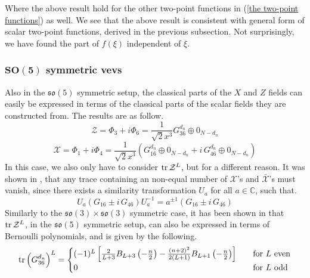 %
%
Where the above result hold for the other two-point functions in (\ref{the two-point functions}) as well. We see that the above result is consistent with general form of scalar two-point functions, derived in the previous subsection. Not surprisingly, we have found the part of $f(\xi)$ independent of $\xi$. 

\subsubsection[$SO(5)$ symmetric vevs]{$\mathbf{SO(5)}$ symmetric vevs}
Also in the $\mathfrak{so}(5)$ symmetric setup, the classical parts of the $X$ and $Z$ fields can easily be expressed in terms of the classical parts of the scalar fields they are constructed from. The results are as follow.
%
%
\begin{equation}
\mathcal{Z} = \Phi_3 + i \Phi_6
= \frac{1}{\sqrt{2} x^3}
G_{36}^{d_n} \oplus 0_{N-d_n}
\end{equation}
%
%
\begin{equation}
\mathcal{X} = \Phi_1 + i \Phi_4
= \frac{1}{\sqrt{2} x^3}
\left(
G_{16}^{d_n} \oplus 0_{N-d_n}
+
i \, G_{46}^{d_n} \oplus 0_{N-d_n}
\right)
\end{equation}
%
%
In this case, we also only have to consider $\tr \mathcal{Z}^L$, but for a different reason. It was shown in \cite{MPS bethe state overlap SO(5)}, that any trace containing an non-equal number of $\mathcal{X}$'s and $\bar{\mathcal{X}}$'s must vanish, since there exists a similarity transformation $U_{a}$ for all $a \in \mathbb{C}$, such that.
%
%
\begin{equation}
U_{a} (G_{16} \pm i \, G_{46}) U_{a}^{-1}
=
a^{\pm1} (G_{16} \pm i \, G_{46})
\end{equation}
%
%
Similarly to the $\mathfrak{so}(3) \times \mathfrak{so}(3)$ symmetric case, it has been shown in \cite{One-point functions in D3-D7 SO(5)} that $\tr \mathcal{Z}^L$, in the $\mathfrak{so}(5)$ symmetric setup, can also be expressed in terms of Bernoulli polynomials, and is given by the following.
%
%
\begin{equation*}
\tr \left( G_{36}^{d_n} \right)^L
=
\begin{cases}
		(-1)^L \left[
		\frac{2}{L+3} B_{L+3} \left( -\frac{n}{2} \right)
		-
		\frac{(n+2)^2}{2 (L+1)} B_{L+1} \left( -\frac{n}{2} \right)
		\right]
		& \quad \text{for } L \text{ even} \\
		
    	0
    	& \quad \text{for } L \text{ odd}
  \end{cases}
\end{equation*}

